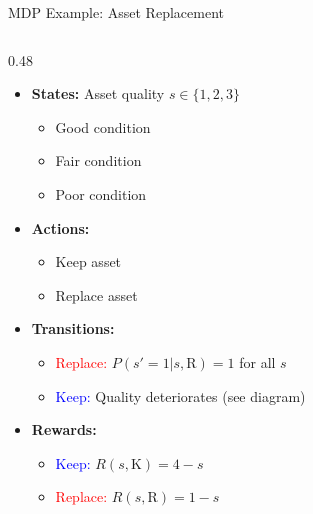 \documentclass[10pt]{beamer}
\begin{document}
\begin{frame}{MDP Example: Asset Replacement}
    \begin{columns}[T] %
        \begin{column}{0.48\textwidth}
            {\small %
            \begin{itemize}\setlength{\itemsep}{2pt} %
                \item \textbf{States:} Asset quality $s \in \{1,2,3\}$
                      \begin{itemize}
                          \item[$s=1$:] Good condition
                          \item[$s=2$:] Fair condition
                          \item[$s=3$:] Poor condition
                      \end{itemize}
                
                \item \textbf{Actions:}
                      \begin{itemize}
                          \item[\textcolor{blue}{K}:] Keep asset
                          \item[\textcolor{red}{R}:] Replace asset
                      \end{itemize}
                
                \item \textbf{Transitions:}
                      \begin{itemize}
                          \item \textcolor{red}{Replace:} $P(s'=1|s,\text{R})=1$ for all $s$
                          \item \textcolor{blue}{Keep:} Quality deteriorates (see diagram)
                      \end{itemize}
                
                \item \textbf{Rewards:}
                      \begin{itemize}
                          \item \textcolor{blue}{Keep:} $R(s,\text{K}) = 4-s$
                          \item \textcolor{red}{Replace:} $R(s,\text{R}) = 1-s$
                      \end{itemize}
                

\end{itemize}}
\end{column}
\end{columns}
\end{frame}
\end{document}
